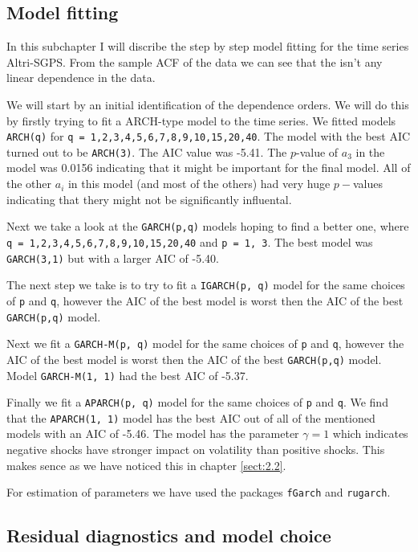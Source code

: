 \documentclass{article}
\begin{document}
\subsection{Model fitting}


In this subchapter I will discribe the step by step model fitting for the time series Altri-SGPS. From the sample ACF of the data we can see that the isn't any
linear dependence in the data.

We will start by an initial identification of the dependence orders. We will do this by firstly trying to fit a ARCH-type model to the time series. We fitted models \verb|ARCH(q)| for \verb|q = 1,2,3,4,5,6,7,8,9,10,15,20,40|. The model with the best AIC turned out to be  \verb|ARCH(3)|. The AIC value was -5.41. The $p$-value of $a_3$ in the model was 0.0156 indicating that it might be important for the final model. All of the other $a_i$ in this model (and most of the others) had very huge $p-$values indicating that thery might not be significantly influental.

Next we take a look at the \verb|GARCH(p,q)| models hoping to find a better one, where \verb|q = 1,2,3,4,5,6,7,8,9,10,15,20,40| and \verb|p = 1, 3|. The best model was  \verb|GARCH(3,1)| but with a larger AIC of  -5.40.

The next step we take is to try to fit a \verb|IGARCH(p, q)| model for the same choices of \verb|p| and \verb|q|, however the AIC of the best model is worst then the AIC of the best \verb|GARCH(p,q)| model.

Next we fit a \verb|GARCH-M(p, q)| model for the same choices of \verb|p| and \verb|q|, however the AIC of the best model is worst then the AIC of the best \verb|GARCH(p,q)| model. Model \verb|GARCH-M(1, 1)| had the best AIC of -5.37.

Finally we fit a \verb|APARCH(p, q)| model for the same choices of \verb|p| and \verb|q|. We find that the \verb|APARCH(1, 1)| model has the best AIC out of all of the mentioned models with an AIC of -5.46. The model has the parameter $\gamma = 1$ which indicates negative shocks have stronger impact on volatility than
positive shocks. This makes sence as we have noticed this in chapter \ref{sect:2.2}. 

For estimation of parameters we have used the packages \verb|fGarch| and \verb|rugarch|. 

\subsection{Residual diagnostics and model choice}
\end{document}
